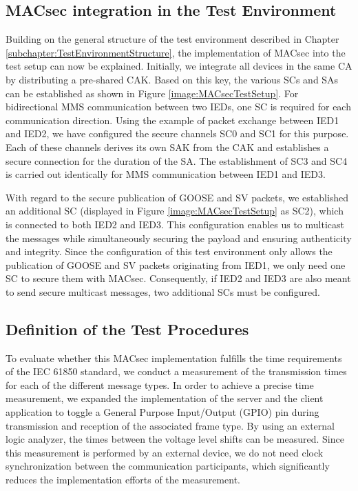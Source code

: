 \documentclass[conference, onecolumn, a4paper]{IEEEtran}
\begin{document}
\subsection{MACsec integration in the Test Environment}
\label{subchapter:TestEnvironmentMACsec}
\noindent Building on the general structure of the test environment described in Chapter \ref{subchapter:TestEnvironmentStructure}, the implementation of 
MACsec into the test setup can now be explained. Initially, we integrate all devices in the same CA by distributing a pre-shared CAK. Based on this key, 
the various SCs and SAs can be established as shown in Figure \ref{image:MACsecTestSetup}. For bidirectional MMS communication between two IEDs, one SC is 
required for each communication direction. Using the example of packet exchange between IED1 and IED2, we have configured the secure channels SC0 and SC1 
for this purpose. Each of these channels derives its own SAK from the CAK and establishes a secure connection for the duration of the SA. The establishment 
of SC3 and SC4 is carried out identically for MMS communication between IED1 and IED3.

\smallskip
With regard to the secure publication of GOOSE and SV packets, we established an additional SC (displayed in Figure \ref{image:MACsecTestSetup} as SC2), 
which is connected to both IED2 and IED3. This configuration enables us to multicast the messages while simultaneously securing the payload and ensuring 
authenticity and integrity. Since the configuration of this test environment only allows the publication of GOOSE and SV packets originating from IED1, 
we only need one SC to secure them with MACsec. Consequently, if IED2 and IED3 are also meant to send secure multicast messages, two additional SCs must be 
configured.   

\subsection{Definition of the Test Procedures}
\label{subchapter:TestProcedures}
\noindent To evaluate whether this MACsec implementation fulfills the time requirements of the IEC 61850 standard, we conduct a measurement of the 
transmission times for each of the different message types. In order to achieve a precise time measurement, we expanded the implementation of the server 
and the client application to toggle a General Purpose Input/Output (GPIO) pin during transmission and reception of the associated frame type. 
By using an external logic analyzer, the times between the voltage level shifts can be measured. Since this measurement is performed by an external device, 
we do not need clock synchronization between the communication participants, which significantly reduces the implementation efforts of the measurement. 
\end{document}
